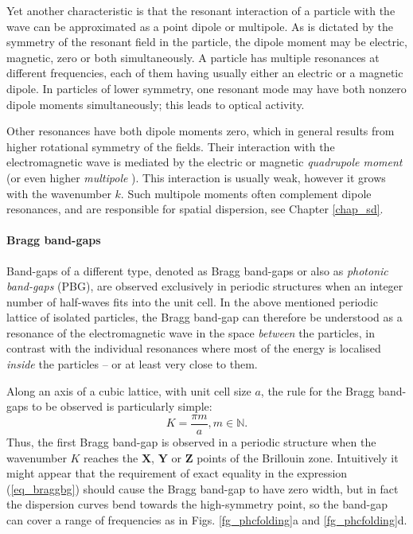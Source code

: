 Yet another characteristic is that the resonant interaction of a particle with the wave can be approximated as a point dipole or multipole. As is dictated by the symmetry of the resonant field in the particle, the dipole moment may be electric, magnetic, zero or both simultaneously. A particle has multiple resonances at different frequencies, each of them having usually either an electric or a magnetic dipole. In particles of lower symmetry, one resonant mode may have both nonzero dipole moments simultaneously; this leads to optical activity. 

Other resonances have both dipole moments zero, which in general results from higher rotational symmetry of the fields. Their interaction with the electromagnetic wave is mediated by the electric or magnetic \textit{quadrupole moment} (or even higher \textit{multipole} \cite{merlin2009metamaterials}). This interaction is usually weak, however it grows with the wavenumber $k$. Such multipole moments often complement dipole resonances, and are responsible for spatial dispersion, see Chapter \ref{chap_sd}. %

\paragraph{Bragg band-gaps}%
Band-gaps of a different type, denoted as Bragg band-gaps or also as \textit{photonic band-gaps} (PBG), are observed exclusively in periodic structures when an integer number of half-waves fits into the unit cell. 
In the above mentioned periodic lattice of isolated particles, the Bragg band-gap can therefore be understood as a resonance of the electromagnetic wave in the space \textit{between} the particles, in contrast with the individual resonances where most of the energy is localised \textit{inside} the particles -- or at least very close to them.

Along an axis of a cubic lattice, with unit cell size $a$, the rule for the Bragg band-gaps to be observed is particularly simple:
\begin{equation} K= \frac{\pi m}{a}, m\in\mathbb{N}. \label{eq_braggbg}\end{equation}
Thus, the first Bragg band-gap is observed in a periodic structure when the wavenumber $K$ reaches the $\mathbf X$, $\mathbf Y$ or $\mathbf Z$ points of the Brillouin zone.
Intuitively it might appear that the requirement of exact equality in the expression (\ref{eq_braggbg}) should cause the Bragg band-gap to have zero width, but in fact the dispersion curves bend towards the high-symmetry point, so the band-gap can cover a range of frequencies as in Figs. \ref{fg_phcfolding}a and \ref{fg_phcfolding}d.

